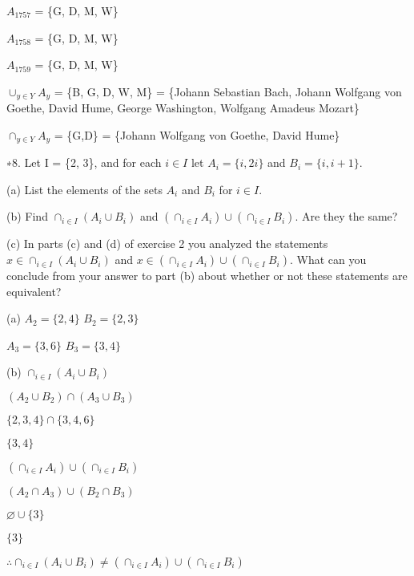 \documentclass{article}
\begin{document}
$A_{1757}$ = \{G, D, M, W\}

$A_{1758}$ = \{G, D, M, W\}

$A_{1759}$ = \{G, D, M, W\}

$\cup_{y\in Y} A_y$ = \{B, G, D, W, M\} = \{Johann Sebastian Bach, Johann Wolfgang von Goethe, David Hume, George Washington, Wolfgang Amadeus Mozart\}

$\cap_{y \in Y} A_y$ = \{G,D\} = \{Johann Wolfgang von Goethe, David Hume\}


\vspace{30pt}

∗8. Let I = \{2, 3\}, and for each $i \in I$ let $A_i = \{i, 2i\}$ and $B_i = \{i,i + 1\}$.

\hspace{12pt}(a) List the elements of the sets $A_i$ and $B_i$ for $i \in I$.

\hspace{12pt}(b) Find $\cap_{i \in I} (A_i \cup B_i)$ and $(\cap_{i \in I} A_i) \cup (\cap_{i \in I} B_i)$. Are they the same?

\hspace{12pt}(c) In parts (c) and (d) of exercise 2 you analyzed the statements $x \in \cap_{i \in I} (A_i \cup B_i)$ and
$x \in (\cap_{i \in I} A_i) \cup (\cap_{i \in I} B_i)$.
What can you conclude from your answer to part (b) about whether or not these statements are equivalent?
\vspace{30pt}

(a) $A_2 = \{2, 4\}$ $B_2 = \{2, 3\}$

$A_3 = \{3, 6\}$ $B_3 = \{3, 4\}$

\vspace{20pt}

(b) $\cap_{i \in I} (A_i \cup B_i)$

$(A_2 \cup B_2) \cap (A_3 \cup B_3)$

$\{2,3,4\} \cap \{3,4,6\}$

$\{3,4\}$

\vspace{10pt}

$(\cap_{i \in I} A_i) \cup (\cap_{i \in I} B_i)$

$(A_2 \cap A_3) \cup (B_2 \cap B_3)$

$\varnothing \cup \{3\}$

$\{3\}$

$\therefore \cap_{i \in I} (A_i \cup B_i) \neq (\cap_{i \in I} A_i) \cup (\cap_{i \in I} B_i)$

\vspace{20pt}
\end{document}
